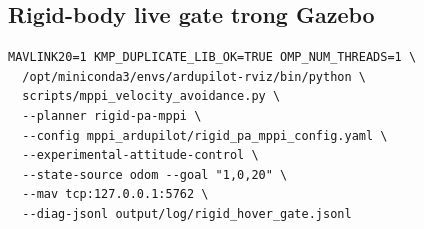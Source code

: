 \documentclass[11pt,a4paper]{article}
\begin{document}
\subsection{Rigid-body live gate trong Gazebo}

\begin{verbatim}
MAVLINK20=1 KMP_DUPLICATE_LIB_OK=TRUE OMP_NUM_THREADS=1 \
  /opt/miniconda3/envs/ardupilot-rviz/bin/python \
  scripts/mppi_velocity_avoidance.py \
  --planner rigid-pa-mppi \
  --config mppi_ardupilot/rigid_pa_mppi_config.yaml \
  --experimental-attitude-control \
  --state-source odom --goal "1,0,20" \
  --mav tcp:127.0.0.1:5762 \
  --diag-jsonl output/log/rigid_hover_gate.jsonl
\end{verbatim}



\end{document}
